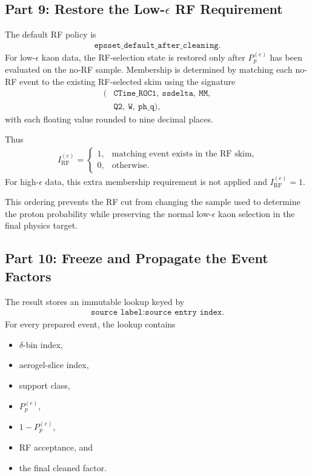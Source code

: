 \documentclass[11pt]{article}
\begin{document}
\subsection{Part 9: Restore the Low-$\epsilon$ RF Requirement}

The default RF policy is
\begin{align}
  \texttt{epsset\_default\_after\_cleaning}.
\end{align}
For low-$\epsilon$ kaon data, the RF-selection state is restored only after
$P_p^{(e)}$ has been evaluated on the no-RF sample.  Membership is determined by
matching each no-RF event to the existing RF-selected skim using the signature
\begin{align}
  (&\texttt{CTime\_ROC1},\ \texttt{ssdelta},\ \texttt{MM},\\
   &\texttt{Q2},\ \texttt{W},\ \texttt{ph\_q}),
\end{align}
with each floating value rounded to nine decimal places.

Thus
\begin{align}
  I_{\mathrm{RF}}^{(e)}
  =\begin{cases}
      1, & \text{matching event exists in the RF skim},\\
      0, & \text{otherwise}.
    \end{cases}
\end{align}
For high-$\epsilon$ data, this extra membership requirement is not applied and
$I_{\mathrm{RF}}^{(e)}=1$.

This ordering prevents the RF cut from changing the sample used to determine
the proton probability while preserving the normal low-$\epsilon$ kaon
selection in the final physics target.

\subsection{Part 10: Freeze and Propagate the Event Factors}

The result stores an immutable lookup keyed by
\begin{align}
  \texttt{source label:source entry index}.
\end{align}
For every prepared event, the lookup contains
\begin{itemize}[leftmargin=2em]
  \item $\delta$-bin index,
  \item aerogel-slice index,
  \item support class,
  \item $P_p^{(e)}$,
  \item $1-P_p^{(e)}$,
  \item RF acceptance, and
  \item the final cleaned factor.
\end{itemize}
\end{document}
